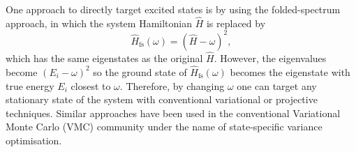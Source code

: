 \documentclass[%
 reprint,
 amsmath,amssymb,
 aps,
]{revtex4-2}
\begin{document}
One approach to directly target excited states is by using the folded-spectrum approach,\cite{Peruzzo2014,Cao2019,CadiTazi2023} in which the system Hamiltonian $\hat H$ is replaced by
\begin{equation}
\hat H_\mathrm{fs} (\omega) =  (\hat H - \omega)^2,
\label{eq:fs_ham}
\end{equation}
which has the same eigenstates as the original $\hat H$. However, the eigenvalues become $(E_i - \omega)^2$ so the ground state of $\hat H_\mathrm{fs}(\omega)$ becomes the eigenstate with true energy $E_i$ closest to $\omega$. Therefore, by changing $\omega$ one can target any stationary state of the system with conventional variational or projective techniques. Similar approaches have been used in the conventional Variational Monte Carlo (VMC) community under the name of state-specific variance optimisation.\cite{Umrigar1988, Zhao2016,Shea2017,Cuzzocrea2020, Otis2023}
\end{document}
